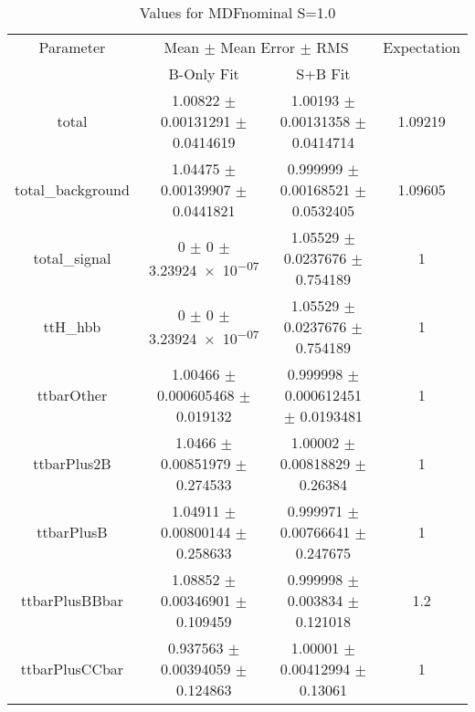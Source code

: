 \begin{table}
\centering
\caption{Values for MDFnominal S=1.0}
\begin{tabular}{cccc}
\toprule
Parameter & \multicolumn{2}{c}{Mean $\pm$ Mean Error $\pm$ RMS} & Expectation\\
 & B-Only Fit & S+B Fit & \\
\midrule
total & \num{1.00822} $\pm$ \num{0.00131291} $\pm$ \num{0.0414619} & \num{1.00193} $\pm$ \num{0.00131358} $\pm$ \num{0.0414714} & \num{1.09219}\\
total\_background & \num{1.04475} $\pm$ \num{0.00139907} $\pm$ \num{0.0441821} & \num{0.999999} $\pm$ \num{0.00168521} $\pm$ \num{0.0532405} & \num{1.09605}\\
total\_signal & \num{0} $\pm$ \num{0} $\pm$ \num{3.23924e-07} & \num{1.05529} $\pm$ \num{0.0237676} $\pm$ \num{0.754189} & \num{1}\\
ttH\_hbb & \num{0} $\pm$ \num{0} $\pm$ \num{3.23924e-07} & \num{1.05529} $\pm$ \num{0.0237676} $\pm$ \num{0.754189} & \num{1}\\
ttbarOther & \num{1.00466} $\pm$ \num{0.000605468} $\pm$ \num{0.019132} & \num{0.999998} $\pm$ \num{0.000612451} $\pm$ \num{0.0193481} & \num{1}\\
ttbarPlus2B & \num{1.0466} $\pm$ \num{0.00851979} $\pm$ \num{0.274533} & \num{1.00002} $\pm$ \num{0.00818829} $\pm$ \num{0.26384} & \num{1}\\
ttbarPlusB & \num{1.04911} $\pm$ \num{0.00800144} $\pm$ \num{0.258633} & \num{0.999971} $\pm$ \num{0.00766641} $\pm$ \num{0.247675} & \num{1}\\
ttbarPlusBBbar & \num{1.08852} $\pm$ \num{0.00346901} $\pm$ \num{0.109459} & \num{0.999998} $\pm$ \num{0.003834} $\pm$ \num{0.121018} & \num{1.2}\\
ttbarPlusCCbar & \num{0.937563} $\pm$ \num{0.00394059} $\pm$ \num{0.124863} & \num{1.00001} $\pm$ \num{0.00412994} $\pm$ \num{0.13061} & \num{1}\\
\bottomrule
\end{tabular}
\end{table}